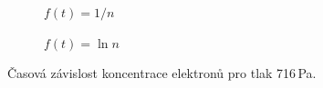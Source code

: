 \documentclass[a4paper,12pt]{article}
\begin{document}
\begin{figure}[h]
	\centering
	\begin{subfigure}[b]{.49\linewidth}
		\centering
		\caption{$f(t) = 1/n$}
	\end{subfigure}
	\begin{subfigure}[b]{.49\linewidth}
		\centering
		\caption{$f(t) = \ln n$}
	\end{subfigure}
	\caption{Časová závislost koncentrace elektronů pro tlak 716\,Pa.}
	\label{g:450Pa}
\end{figure}
\end{document}
